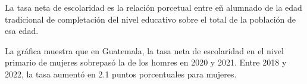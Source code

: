 La tasa neta de escolaridad es la relación porcetual entre eñ alumnado de la edad tradicional de completación del nivel educativo sobre el total de la población de esa edad.

La gráfica muestra que en Guatemala, la tasa neta de escolaridad en el nivel primario de mujeres sobrepasó la de los homres en 2020 y 2021. Entre 2018 y 2022, la tasa aumentó en 2.1 puntos porcentuales para mujeres.